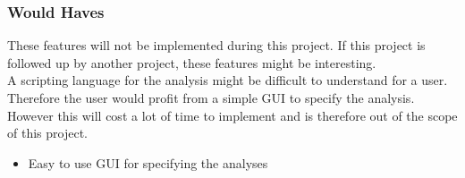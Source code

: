 \subsubsection{Would Haves}
These features will not be implemented during this project. If this project is followed up by another project, these features might be interesting.\\
A scripting language for the analysis might be difficult to understand for a user. Therefore the user would profit from a simple GUI to specify the analysis. However this will cost a lot of time to implement and is therefore out of the scope of this project. 
\begin{itemize}
	\item Easy to use GUI for specifying the analyses 
\end{itemize}
